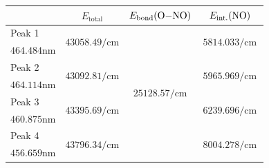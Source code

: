 \documentclass[aspectratio=43,scheme=plain]{ctexbeamer}
\begin{document}
	\begin{frame}{\insertsubsection}{\insertsubsubsection}
		\begin{table}[htbp]
			\centering
			\tiny
			\begin{tabularx}{0.73\textwidth}{lccc}		
				\toprule		
				& $E_\text{total}$ & $E_\text{bond}(\ce{O-NO})$ \footfullcite{ono}& $E_\text{int.}(\ce{NO})$ \\
				\midrule
				Peak 1 & \multirow{2}[2]{*}{$\num{43058.49}\unit{\per \centi \meter}$} & \multirow{8}[8]{*}{$\num{25128.57}\unit{\per \centi \meter}$} & \multirow{2}[2]{*}{\,\;\;$\num{5814.033}\unit{\per \centi \meter}$\,\;\;} \\
				$\num{464.484}\unit{\nano\meter}$ & & & \\
				\cmidrule{1-2}\cmidrule{4-4}
				Peak 2 & \multirow{2}[2]{*}{$\num{43092.81}\unit{\per \centi \meter}$} & & \multirow{2}[2]{*}{$\num{5965.969}\unit{\per \centi \meter}$} \\
				$\num{464.114}\unit{\nano\meter}$ & & & \\
				\cmidrule{1-2}\cmidrule{4-4}
				Peak 3 & \multirow{2}[2]{*}{$\num{43395.69}\unit{\per \centi \meter}$} & & \multirow{2}[2]{*}{$\num{6239.696}\unit{\per \centi \meter}$} \\
				$\num{460.875}\unit{\nano\meter}$ & & & \\
				\cmidrule{1-2}\cmidrule{4-4}
				Peak 4 & \multirow{2}[2]{*}{$\num{43796.34}\unit{\per \centi \meter}$} & & \multirow{2}[2]{*}{$\num{8004.278}\unit{\per \centi \meter}$} \\
				$\num{456.659}\unit{\nano\meter}$ & & & \\
				\bottomrule
			\end{tabularx}
		\end{table}
	\end{frame}
\end{document}
